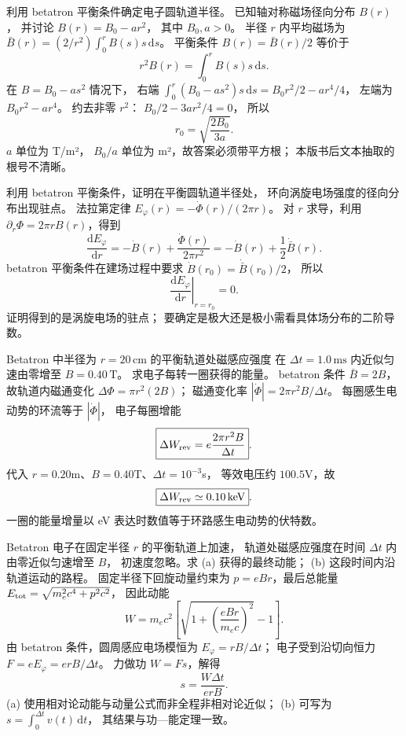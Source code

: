 利用 betatron 平衡条件确定电子圆轨道半径。
已知轴对称磁场径向分布 $B(r)$，
并讨论 $B(r)=B_0-ar^2$，
其中 $B_0,a>0$。
\exsolution
半径 $r$ 内平均磁场为
$\bar B(r)=(2/r^2)\int_0^rB(s)s\,\mathrm ds$。
平衡条件
$B(r)=\bar B(r)/2$ 等价于
\[
\boxed{r^2B(r)=\int_0^rB(s)s\,\mathrm ds}.
\]
在 $B=B_0-as^2$ 情况下，
右端
$\int_0^r(B_0-as^2)s\,\mathrm ds
=B_0r^2/2-ar^4/4$，
左端为
$B_0r^2-ar^4$。
约去非零 $r^2$：
$B_0/2-3ar^2/4=0$，
所以
\[
\boxed{r_0=\sqrt{\frac{2B_0}{3a}}}.
\]
\excheck $a$ 单位为 T/m²，
$B_0/a$ 单位为 m²，故答案必须带平方根；
本版书后文本抽取的根号不清晰。

利用 betatron 平衡条件，证明在平衡圆轨道半径处，
环向涡旋电场强度的径向分布出现驻点。
\exsolution
法拉第定律
$E_\varphi(r)=-\dot\Phi(r)/(2\pi r)$。
对 $r$ 求导，利用
$\partial_r\Phi=2\pi rB(r)$，得到
\[
\frac{\mathrm dE_\varphi}{\mathrm dr}
=-\dot B(r)+\frac{\dot\Phi(r)}{2\pi r^2}
=-\dot B(r)+\frac12\dot{\bar B}(r).
\]
betatron 平衡条件在建场过程中要求
$\dot B(r_0)=\dot{\bar B}(r_0)/2$，
所以
\[
\boxed{\left.
\frac{\mathrm dE_\varphi}{\mathrm dr}
\right|_{r=r_0}=0}.
\]
\excheck 证明得到的是涡旋电场的驻点；
要确定是极大还是极小需看具体场分布的二阶导数。

Betatron 中半径为 $r=20\,\mathrm{cm}$ 的平衡轨道处磁感应强度
在 $\Delta t=1.0\,\mathrm{ms}$ 内近似匀速由零增至 $B=0.40\,\mathrm T$。
求电子每转一圈获得的能量。
\exsolution
betatron 条件 $\bar B=2B$，故轨道内磁通变化
$\Delta\Phi=\pi r^2(2B)$；
磁通变化率
$|\dot\Phi|=2\pi r^2B/\Delta t$。
每圈感生电动势的环流等于 $|\dot\Phi|$，
电子每圈增能
\[
\boxed{\Delta W_{\rm rev}=e\frac{2\pi r^2B}{\Delta t}}.
\]
代入 $r=0.20$m、$B=0.40$T、$\Delta t=10^{-3}$s，
等效电压约 $100.5$V，故
\[
\boxed{\Delta W_{\rm rev}\simeq0.10\,\mathrm{keV}}.
\]
\excheck 一圈的能量增量以 eV 表达时数值等于环路感生电动势的伏特数。

Betatron 电子在固定半径 $r$ 的平衡轨道上加速，
轨道处磁感应强度在时间 $\Delta t$ 内
由零近似匀速增至 $B$，
初速度忽略。求 (a) 获得的最终动能；
(b) 这段时间内沿轨道运动的路程。
\exsolution
固定半径下回旋动量约束为
$p=eBr$，最后总能量
$E_{\rm tot}=\sqrt{m_e^2c^4+p^2c^2}$，
因此动能
\[
\boxed{W=m_ec^2\left[
\sqrt{1+\left(\frac{eBr}{m_ec}\right)^2}-1
\right]}.
\]
由 betatron 条件，圆周感应电场模恒为
$E_\varphi=rB/\Delta t$；
电子受到沿切向恒力
$F=eE_\varphi=erB/\Delta t$。
力做功 $W=Fs$，解得
\[
\boxed{s=\frac{W\Delta t}{erB}}.
\]
\excheck (a) 使用相对论动能与动量公式而非全程非相对论近似；
(b) 可写为 $s=\int_0^{\Delta t}v(t)\,\mathrm dt$，
其结果与功—能定理一致。
